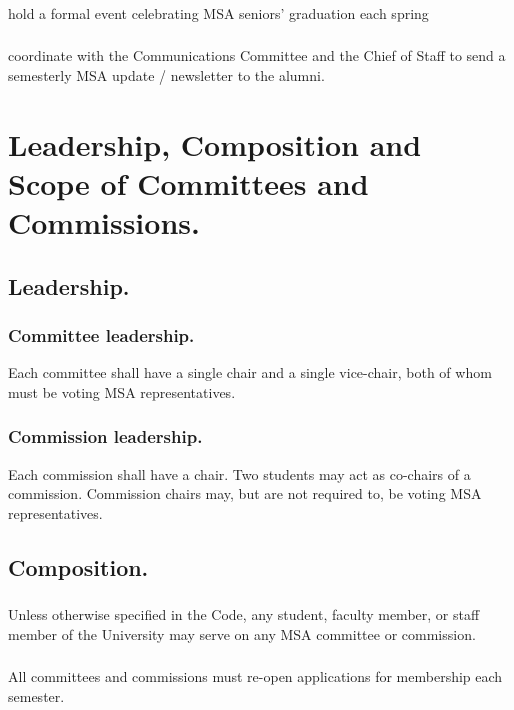 \subsubsection{}
hold a formal event celebrating MSA seniors' graduation each spring
\subsubsection{}
coordinate with the Communications Committee and the Chief of Staff to send a semesterly MSA update / newsletter to the alumni.


\section{Leadership, Composition and Scope of Committees and Commissions.}

\subsection{Leadership.}

\subsubsection{Committee leadership.}
Each committee shall have a single chair and a single vice-chair, both of whom must be voting MSA representatives. 

\subsubsection{Commission leadership.}  Each commission shall have a chair.  Two students may act as co-chairs of a commission.  Commission chairs may, but are not required to, be voting MSA representatives.

\subsection{Composition.}

\subsubsection{}
Unless otherwise specified in the Code, any student, faculty member, or staff member of the University may serve on any MSA committee or commission.
\subsubsection{}
All committees and commissions must re-open applications for membership each semester.

